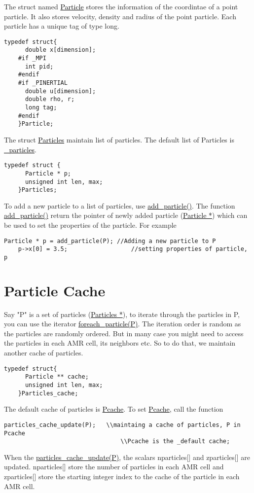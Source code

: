 \documentclass[a4paper,12pt]{article}
\newcommand{\fname}[1]{\textcolor{black}{\underline{#1}}}
\begin{document}
    The struct named \fname{Particle} stores the information of the coordintae of a point particle. It also stores velocity, density and radius of the point particle. Each particle has a unique tag of type long.
    \begin{lstlisting}[style=CStyle]
    typedef struct{
      double x[dimension];
    #if _MPI
      int pid;
    #endif
    #if _PINERTIAL
      double u[dimension];
      double rho, r;
      long tag;
    #endif
    }Particle;
    \end{lstlisting}
    
    The struct \fname{Particles} maintain list of particles. The default list of Particles is \fname{\_particles}.
    
    \begin{lstlisting}[style=CStyle]
    typedef struct {
      Particle * p;
      unsigned int len, max;
    }Particles;
    \end{lstlisting}
    
    
    
    To add a new particle to a list of particles, use \fname{add\_particle()}. The function \fname{add\_particle()} return the pointer of newly added particle (\fname{Particle *}) which can be used to set the properties of the particle. For example
    \begin{lstlisting}[style=CStyle]
    Particle * p = add_particle(P); //Adding a new particle to P
    p->x[0] = 3.5;                  //setting properties of particle, p
    \end{lstlisting}
    
    \section{Particle Cache}
    Say "P" is a set of particles (\fname{Particles *}), to iterate through the particles in P, you can use the iterator \fname{foreach\_particle(P)}. The iteration order is random as the particles are randomly ordered. But in many case you might need to access the particles in each AMR cell, its neighbors etc. So to do that, we maintain another cache of particles.
    
    \begin{lstlisting}[style=CStyle]
    typedef struct{
      Particle ** cache;
      unsigned int len, max;
    }Particles_cache;
    \end{lstlisting}
    
    
    The default cache of particles is \fname{Pcache}. To set  \fname{Pcache}, call the function
    \begin{lstlisting}[style=CStyle]
    particles_cache_update(P);   \\maintaing a cache of particles, P in Pcache
                                 \\Pcache is the _default cache;
    \end{lstlisting}
    When the \fname{particles\_cache\_update(P)}, the scalars nparticles[] and zparticles[] are updated. nparticles[] store the number of particles in each AMR cell and zparticles[] store the starting integer index to the cache of the particle in each AMR cell.
    
\end{document}
